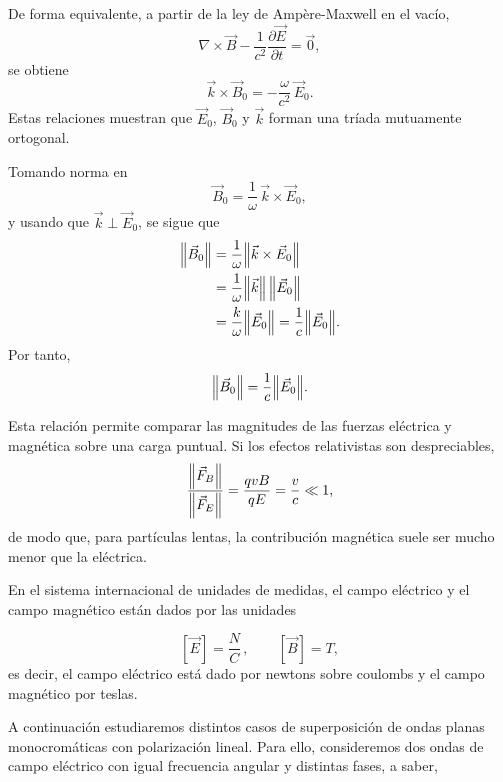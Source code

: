 \documentclass[12pt,a4paper]{article}
\theoremstyle{definition}
\theoremstyle{plain}
\numberwithin{equation}{section}
\theoremstyle{remark}
\newcommand{\E}{\vec{E}}
\newcommand{\B}{\vec{B}}
\newcommand{\rot}{\nabla\times}
\begin{document}
De forma equivalente, a partir de la ley de Ampère-Maxwell en el vacío,
\begin{equation*}
    \rot \B-\frac{1}{c^2}\frac{\partial \E}{\partial t}=\vec 0,
\end{equation*}
se obtiene
\begin{equation*}
    \vec k\times \vec B_0=-\frac{\omega}{c^2}\,\vec E_0.
\end{equation*}
Estas relaciones muestran que $\vec E_0$, $\vec B_0$ y $\vec k$ forman una tríada mutuamente ortogonal.

Tomando norma en
\begin{equation*}
    \vec B_0=\frac{1}{\omega}\,\vec k\times \vec E_0,
\end{equation*}
y usando que $\vec k\perp \vec E_0$, se sigue que
\begin{align*}
    \norm{\vec B_0}
    &=\frac{1}{\omega}\norm{\vec k\times \vec E_0} \\
    &=\frac{1}{\omega}\norm{\vec k}\,\norm{\vec E_0} \\
    &=\frac{k}{\omega}\norm{\vec E_0}
    =\frac{1}{c}\norm{\vec E_0}.
\end{align*}
Por tanto,
\begin{equation*}
    \norm{\vec B_0}=\frac{1}{c}\norm{\vec E_0}.
\end{equation*}

Esta relación permite comparar las magnitudes de las fuerzas eléctrica y magnética sobre una carga puntual. Si los efectos relativistas son despreciables,
\begin{equation*}
    \frac{\norm{\vec F_B}}{\norm{\vec F_E}}
    =\frac{qvB}{qE}
    =\frac{v}{c}\ll 1,
\end{equation*}
de modo que, para partículas lentas, la contribución magnética suele ser mucho menor que la eléctrica.

En el sistema internacional de unidades de medidas, el campo eléctrico y el campo magnético están dados por las unidades

\begin{equation*}
    \left[\vec E\right]= \frac{N}{C} \, ,\qquad \left[ \vec B\right]=T,
\end{equation*}
es decir, el campo eléctrico está dado por newtons sobre coulombs y el campo magnético por teslas.

A continuación estudiaremos distintos casos de superposición de ondas planas monocromáticas con polarización lineal. Para ello, consideremos dos ondas de campo eléctrico con igual frecuencia angular y distintas fases, a saber,
\end{document}
